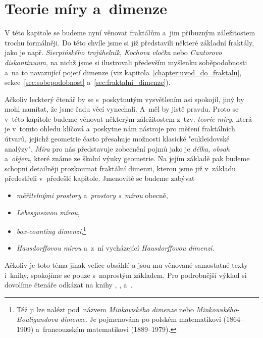 \chapter{Teorie míry a~dimenze}\label{chapter:teorie-miry-a-dimenze}

V této kapitole se budeme nyní věnovat fraktálům a~jim příbuzným záležitostem trochu formálněji. Do této chvíle jsme si již představili některé základní fraktály, jako je např. \emph{Sierpińského trojúhelník}, \emph{Kochova vločka} nebo \emph{Cantorovo diskontinuum}, na nichž jsme si ilustrovali především myšlenku soběpodobnosti a~na to navazující pojetí dimenze (viz kapitola~\ref{chapter:uvod_do_fraktalu}, sekce~\ref{sec:sobepodobnost} a~\ref{sec:fraktalni_dimenze}).

Ačkoliv leckterý čtenář by se s~poskytnutým vysvětlením asi spokojil, jiný by mohl namítat, že jsme řadu věcí vynechali. A~měl by jistě pravdu. Proto se v~této kapitole budeme věnovat některým záležitostem z~tzv. \emph{teorie míry}, která je v~tomto ohledu klíčová a~poskytne nám nástroje pro měření fraktálních útvarů, jejichž geometrie často přesahuje možnosti klasické "eukleidovské analýzy". \emph{Míra} pro nás představuje zobecnění pojmů jako je \emph{délka, obsah} a~\emph{objem}, které známe ze školní výuky geometrie. Na jejím základě pak budeme schopni detailněji prozkoumat fraktální dimenzi, kterou jsme již v~základu předestřeli v~předešlé kapitole. Jmenovitě se budeme zabývat
\begin{itemize}
    \item \emph{měřitelnými prostory} a~\emph{prostory s~mírou} obecně,
    \item \emph{Lebesgueovou mírou},
    \item \emph{box-counting dimenzí},\footnote{Též ji lze nalézt pod~názvem \emph{Minkowského dimenze} nebo \emph{Minkowského-Bouligandova dimenze}. Je pojmenována po polském matematikovi  (1864--1909) a~francouzském matematikovi  (1889--1979).}
    \item \emph{Hausdorffovou mírou} a~z~ní vycházející \emph{Hausdorffovou dimenzí}.
\end{itemize}

Ačkoliv je toto téma jinak velice obsáhlé a jsou mu věnované samostatné texty i~knihy, spokojíme se pouze s~naprostým základem. Pro podrobnější výklad si dovolíme čtenáře odkázat na knihy \cite{Falconer2014}, \cite{Lukes2013}, \cite{NetukaIntegral2016} a~\cite{Edgar2008}.

